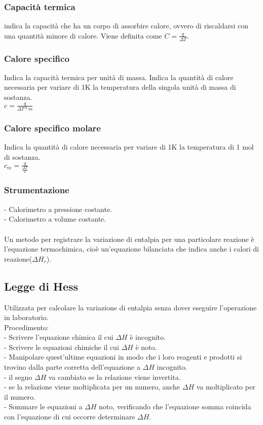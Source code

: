 \subsubsection{Capacità termica}
indica la capacità che ha un corpo di assorbire calore, ovvero di riscaldarsi con una quantità minore di calore. Viene definita come $C = \frac{q}{\Delta T}$.
\subsubsection{Calore specifico}
Indica la capacità termica per unità di massa. Indica la quantità di calore necessaria per variare di 1K la temperatura della singola unità di massa di sostanza.\\
$c = \frac{q}{\Delta T* m}$
\subsubsection{Calore specifico molare}
Indica la quantità di calore necessaria per variare di 1K la temperatura di 1 mol di sostanza.\\
$c_m = \frac{q}{\frac{\Delta T}{n}}$
\subsubsection{Strumentazione}
\tab- Calorimetro a pressione costante.\\
\tab- Calorimetro a volume costante.\\\\
Un metodo per registrare la variazione di entalpia per una particolare reazione è l'equazione termochimica, cioè un'equazione bilanciata che indica anche i calori di reazione($\Delta H_r$).
\subsection{Legge di Hess}
Utilizzata per calcolare la variazione di entalpia senza dover eseguire l'operazione in laboratorio.\\
Procedimento:\\
\tab- Scrivere l'equazione chimica il cui $\Delta H$ è incognito.\\
\tab- Scrivere le equazioni chimiche il cui $\Delta H$ è noto.\\
\tab- Manipolare quest'ultime equazioni in modo che i loro reagenti e prodotti si trovino dalla parte corretta dell'equazione a $\Delta H$ incognito.\\
\tab\tab- il segno $\Delta H$ va cambiato se la relazione viene invertita.\\
\tab\tab- se la relazione viene moltiplicata per un numero, anche $\Delta H$ va moltiplicato per il numero.\\
\tab- Sommare le equazioni a $\Delta H$ noto, verificando che l'equazione somma coincida con l'equazione di cui occorre determinare $\Delta H$.
